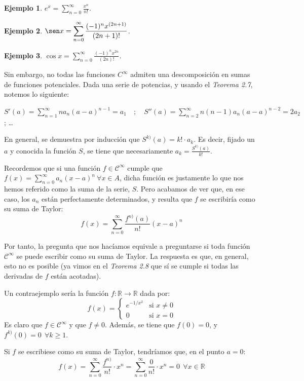 \documentclass[11pt, a4paper]{article}
\theoremstyle{theorem-style}
\theoremstyle{definition-style}
\theoremstyle{remark-style}
\theoremstyle{example-style}
\newtheorem{ejemplo}{Ejemplo}[section]
\begin{document}
\begin{ejemplo}
	$e^x = \displaystyle \sum_{n=0}^\infty  \frac{x^n}{n!}$. 
\end{ejemplo}

\begin{ejemplo}
	$\sen x = \displaystyle \sum_{n=0}^\infty   \frac{(-1)^n x^{(2n+1)}}{(2n+1)!}$.
\end{ejemplo}
\begin{ejemplo}
	$\cos x = \displaystyle \sum_{n=0}^\infty   \frac{(-1)^n x^{2n}}{(2n)!}$.
\end{ejemplo}


Sin embargo, no todas las funciones $C^{\infty}$ admiten una descomposición en sumas de funciones potenciales. Dada una serie de potencias, y usando el \textit{Teorema 2.7}, notemos lo siguiente:

$\displaystyle S'(a) = \sum_{n=1}^{\infty} na_n(a-a)^{n-1} = a_1 \quad ; \quad S''(a) = \sum_{n=2}^{\infty} n(n-1)a_n(a-a)^{n-2} = 2a_2$ \quad ; \quad \dots

En general, se demuestra por inducción que $S^{k)} (a) = k! \cdot a_k$. Es decir, fijado un $a$ y conocida la función $S$, se tiene que necesariamente $a_k = \frac{S^{k)}(a)}{k!}$.

Recordemos que si una función $f \in \mathcal{C}^{\infty}$ cumple que $f(x) = \sum_{n=0}^{\infty} a_n(x-a)^n\ \forall x \in A$, dicha función es justamente lo que nos hemos referido como la suma de la serie, $S$. Pero acabamos de ver que, en ese caso, los $a_n$ están perfectamente determinados, y resulta que $f$ se escribiría como su suma de Taylor: $$f(x) = \sum_{n=0}^{\infty} \frac{f^{n)}(a)}{n!} (x-a)^n$$

Por tanto, la pregunta que nos hacíamos equivale a preguntarse si toda función $\mathcal{C}^{\infty}$ se puede escribir como su suma de Taylor. La respuesta es que, en general, esto no es posible (ya vimos en el \textit{Teorema 2.8} que sí se cumple si todas las derivadas de $f$ están acotadas).

Un contraejemplo sería la función $f: \mathbb{R} \longrightarrow \mathbb{R}$ dada por: $$f(x) = \begin{cases}
	         e^{-1/x^2} & \text{si } x\ne 0\\
	         0 & \text{si } x=0
\end{cases}$$ Es claro que $f \in \mathcal{C}^{\infty}$ y que $f \ne 0$. Además, se tiene que $f(0) = 0$, y $f^{k)}(0) = 0\ \ \forall k \ge 1$. 

Si $f$ se escribiese como su suma de Taylor, tendríamos que, en el punto $a=0$: $$f(x) = \sum_{n=0}^{\infty} \frac{f^{n)}}{n!} \cdot x^n =  \sum_{n=0}^{\infty} \frac{0}{n!}\cdot x^n = 0\ \ \forall x \in \mathbb{R}$$
\end{document}
